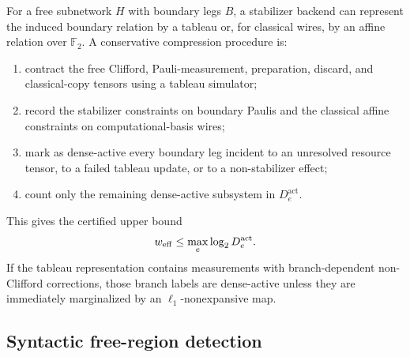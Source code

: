 For a free subnetwork \(H\) with boundary legs \(B\), a stabilizer backend can represent the induced boundary relation by a tableau or, for classical wires, by an affine relation over \(\mathbb F_2\). A conservative compression procedure is:
\begin{enumerate}[leftmargin=1.2cm]
\item contract the free Clifford, Pauli-measurement, preparation, discard, and classical-copy tensors using a tableau simulator;
\item record the stabilizer constraints on boundary Paulis and the classical affine constraints on computational-basis wires;
\item mark as dense-active every boundary leg incident to an unresolved resource tensor, to a failed tableau update, or to a non-stabilizer effect;
\item count only the remaining dense-active subsystem in \(D_e^{\mathrm{act}}\).
\end{enumerate}
This gives the certified upper bound
\[
w_{\mathrm{eff}}\le \max_e \log_2 D_e^{\mathrm{act}}.
\]
If the tableau representation contains measurements with branch-dependent non-Clifford corrections, those branch labels are dense-active unless they are immediately marginalized by an \(\ell_1\)-nonexpansive map.

\begin{center}
\end{center}

\subsection{Syntactic free-region detection}

